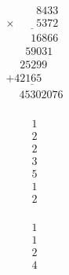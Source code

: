 \begin{minipage}[t]{0.3\linewidth}
\begin{align*}\begin{array}{c}
\phantom{
\times0000
}
8433\\
\underline{
\times
\phantom{
0000
}
5372
}\\
\phantom{
+000
}
16866
\\
\phantom{
+00
}
59031
\phantom0\\
\phantom{
+0
}
25299
\phantom0\phantom0\\
\underline{
+
42165
\phantom0\phantom0\phantom0
}
\\
\phantom{+}
45302076
\end{array}\end{align*}
\end{minipage}
\begin{minipage}[t]{0.05\linewidth}
\begin{align*}\begin{array}{c}
1
\\
2
\\
2
\\
3
\\
5
\\
1
\\
2
\end{array}\end{align*}
\end{minipage}
\begin{minipage}[t]{0.05\linewidth}
\begin{align*}\begin{array}{c}
1
\\
1
\\
2
\\
4
\end{array}\end{align*}
\end{minipage}

